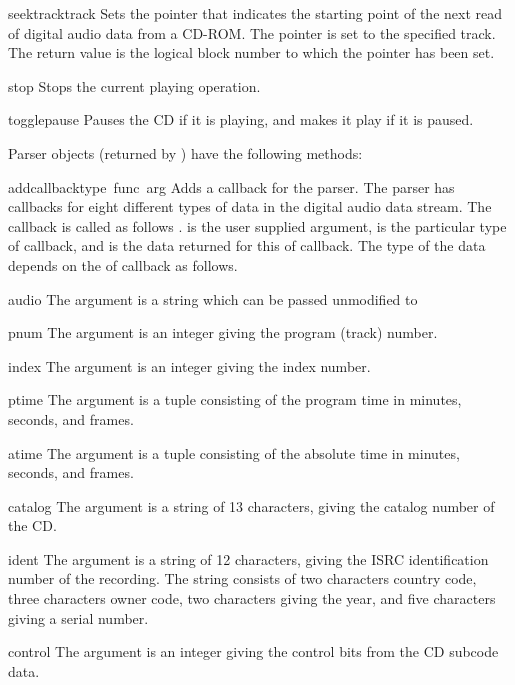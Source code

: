 \begin{funcdesc}{seektrack}{track}
Sets the pointer that indicates the starting point of the next read of
digital audio data from a CD-ROM.  The pointer is set to the specified
track.  The return value is the logical block number to which the
pointer has been set.
\end{funcdesc}

\begin{funcdesc}{stop}{}
Stops the current playing operation.
\end{funcdesc}

\begin{funcdesc}{togglepause}{}
Pauses the CD if it is playing, and makes it play if it is paused.
\end{funcdesc}

Parser objects (returned by ) have the
following methods:

\begin{funcdesc}{addcallback}{type\, func\, arg}
Adds a callback for the parser.  The parser has callbacks for eight
different types of data in the digital audio data stream.  The
callback is called as follows .
 is the user supplied argument,  is the
particular type of callback, and  is the data returned for
this  of callback.  The type of the data depends on the
 of callback as follows.
\begin{datadesc}{audio}
The argument is a string which can be passed unmodified to
\end{datadesc}
\begin{datadesc}{pnum}
The argument is an integer giving the program (track) number.
\end{datadesc}
\begin{datadesc}{index}
The argument is an integer giving the index number.
\end{datadesc}
\begin{datadesc}{ptime}
The argument is a tuple consisting of the program time in minutes,
seconds, and frames.
\end{datadesc}
\begin{datadesc}{atime}
The argument is a tuple consisting of the absolute time in minutes,
seconds, and frames.
\end{datadesc}
\begin{datadesc}{catalog}
The argument is a string of 13 characters, giving the catalog number
of the CD.
\end{datadesc}
\begin{datadesc}{ident}
The argument is a string of 12 characters, giving the ISRC
identification number of the recording.  The string consists of two
characters country code, three characters owner code, two characters
giving the year, and five characters giving a serial number.
\end{datadesc}
\begin{datadesc}{control}
The argument is an integer giving the control bits from the CD subcode
data.
\end{datadesc}
\end{funcdesc}

